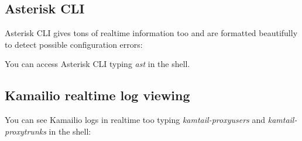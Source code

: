 \documentclass[letterpaper,10pt,english]{sphinxmanual}
\begin{document}
\subsection{Asterisk CLI}
\label{maintenance/log_viewer:asterisk-cli}
Asterisk CLI gives tons of realtime information too and are formatted beautifully
to detect possible configuration errors:

\noindent{}

You can access Asterisk CLI typing \emph{ast} in the shell.


\subsection{Kamailio realtime log viewing}
\label{maintenance/log_viewer:kamailio-realtime-log-viewing}
You can see Kamailio logs in realtime too typing \emph{kamtail-proxyusers} and
\emph{kamtail-proxytrunks} in the shell:

\noindent{}



\renewcommand{\indexname}{Index}
\printindex
\end{document}
